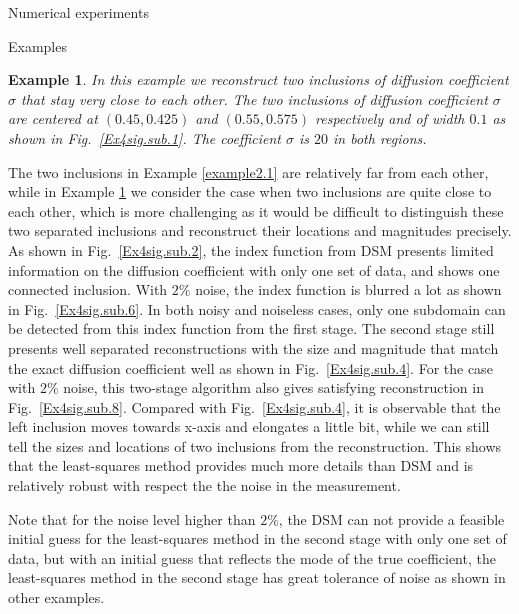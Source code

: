 \documentclass[11pt]{article}%
\renewcommand{\_}{{\fontfamily{ptm}\selectfont\textunderscore}}
\theoremstyle{plain}
\numberwithin{equation}{section}
\newtheorem{exam}{Example}
\begin{document}
\begin{section}{Numerical experiments}
\begin{subsection}{Examples}
\begin{exam}\label{example2.2} 
In this example we reconstruct two inclusions of  diffusion coefficient $\sigma$ that stay very close to each other. 
The two inclusions of diffusion coefficient $\sigma$ are centered at $(0.45,0.425)$ and $(0.55,0.575)$ respectively and of width $0.1$ as shown in Fig.~\ref{Ex4sig.sub.1}. The coefficient $\sigma$ is $20$ in both regions.
\end{exam}

The two inclusions in Example \ref{example2.1} are relatively far from each other, while in Example \ref{example2.2} we consider the case when two inclusions are quite close to each other, which is more challenging as it would be difficult to distinguish these two separated inclusions and reconstruct their locations and magnitudes precisely. As shown in Fig.~\ref{Ex4sig.sub.2}, the index function from DSM presents limited information on the diffusion coefficient with only one set of data, and shows one connected inclusion. With $2\%$ noise, the index function is blurred a lot as shown in Fig.~\ref{Ex4sig.sub.6}. In both noisy and noiseless cases, only one subdomain can be detected from this index function from the first stage. 
The second stage still presents well separated reconstructions with the size and magnitude that match the exact diffusion coefficient well as shown in Fig.~\ref{Ex4sig.sub.4}. For the case with $2\%$ noise, this two-stage algorithm also gives satisfying reconstruction  in Fig.~\ref{Ex4sig.sub.8}. Compared with Fig.~\ref{Ex4sig.sub.4},  it is observable that the left inclusion moves towards x-axis and elongates a little bit, while we can still tell the sizes and locations of two inclusions from the reconstruction. 
This shows that the least-squares method provides much more details than DSM and is relatively robust with respect the the noise in the measurement. 

Note that for the noise level higher than $2\%$, the DSM can not provide a feasible initial guess for the least-squares method in the second stage with only one set of data, but with an initial guess that reflects the mode of the true coefficient, the least-squares method in the second stage has great tolerance of noise as shown in other examples.


\end{subsection}
\end{section}
\end{document}
